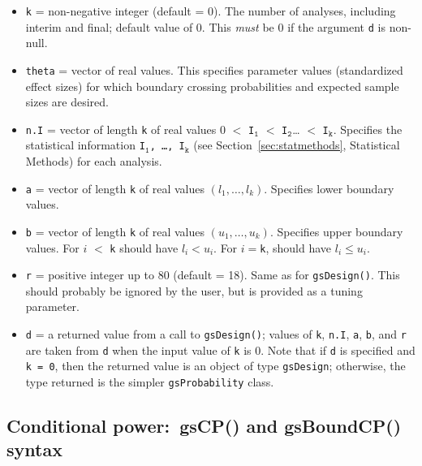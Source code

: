 \begin{itemize}
\item \texttt{k} = non-negative integer (default = 0). The number of
analyses, including interim and final; default value of 0. This {\em must} be 
0 if the argument \texttt{d} is non-null.

\item \texttt{theta} = vector of real values. This specifies parameter values
(standardized effect sizes) for which boundary crossing probabilities and
expected sample sizes are desired.

\item \texttt{n.I} = vector of length \texttt{k} of real values 0 %
$<$
 \texttt{I}$_{\mathtt{1}}$%
$<$
\texttt{I}$_{\mathtt{2}}$\ldots%
$<$%
\texttt{I}$_{\mathtt{k}}$. Specifies the statistical information
\texttt{I}$_{\mathtt{1}}$\texttt{, \ldots, I}$_{\mathtt{k}}$ (see 
Section~\ref{sec:statmethods}, Statistical Methods)
for each analysis.

\item \texttt{a} = vector of length \texttt{k} of real values $(l_{1}%
, \ldots, l_{k})$. Specifies lower boundary values.

\item \texttt{b} = vector of length \texttt{k} of real values $(u_{1}%
, \ldots, u_{k})$. Specifies upper boundary values. For $i$ %
$<$%
 \texttt{k} should have $l_{i} < u_{i}$. For $i = $\texttt{k}, should have
$l_{i} \leq u_{i}$.

\item \texttt{r} =  positive integer up to 80 (default = 18). Same as for
\texttt{gsDesign()}. This should probably be ignored by the user, but is
provided as a tuning parameter.

\item \texttt{d} = a returned value from a call to \texttt{gsDesign()};
values of \texttt{k}, \texttt{n.I}, \texttt{a}, \texttt{b}, and \texttt{r}
are taken from \texttt{d} when the input value of \texttt{k} is 0. Note
that if \texttt{d} is specified and \texttt{k = 0}, then the returned value 
is an object of type \texttt{gsDesign}; otherwise, the type returned is the
simpler \texttt{gsProbability} class.
\end{itemize}

\subsection{Conditional power:\ gsCP() and gsBoundCP() syntax}

